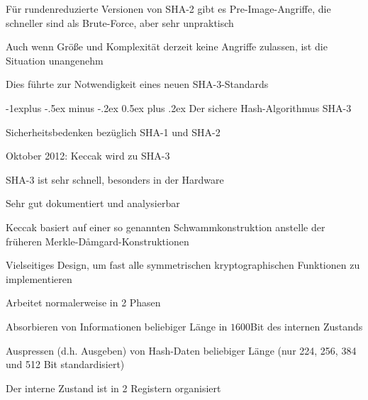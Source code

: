 \documentclass[a4paper]{article}
\makeatletter
\renewcommand{\subsection}{\@startsection{subsection}{2}{0mm}%
 {-1explus -.5ex minus -.2ex}%
 {0.5ex plus .2ex}%
 {\normalfont\normalsize\bfseries}}
\makeatother
\begin{document}
\begin{multicols}{3}
\begin{itemize*}
\begin{itemize*}
\begin{itemize*}
                        \item Für rundenreduzierte Versionen von SHA-2 gibt es Pre-Image-Angriffe, die schneller sind als Brute-Force, aber sehr unpraktisch
                        \item Auch wenn Größe und Komplexität derzeit keine Angriffe zulassen, ist die Situation unangenehm
                        \item Dies führte zur Notwendigkeit eines neuen SHA-3-Standards
                  \end{itemize*}
            \end{itemize*}
      \end{itemize*}

      \subsection{Der sichere Hash-Algorithmus SHA-3}
      \begin{itemize*}
            \item Sicherheitsbedenken bezüglich SHA-1 und SHA-2
            \begin{itemize*}
                  \item Oktober 2012: Keccak wird zu SHA-3
                  \item SHA-3 ist sehr schnell, besonders in der Hardware
                  \item Sehr gut dokumentiert und analysierbar
            \end{itemize*}
            \item Keccak basiert auf einer so genannten Schwammkonstruktion anstelle der früheren Merkle-Dåmgard-Konstruktionen
            \item Vielseitiges Design, um fast alle symmetrischen kryptographischen Funktionen zu implementieren
            \item Arbeitet normalerweise in 2 Phasen
            \begin{description*}
                  \item[Absorbieren] von Informationen beliebiger Länge in $1600$Bit des internen Zustands
                  \item[Auspressen] (d.h. Ausgeben) von Hash-Daten beliebiger Länge (nur 224, 256, 384 und 512 Bit standardisiert)
            \end{description*}
            \item Der interne Zustand ist in 2 Registern organisiert
            \begin{itemize*}

\end{itemize*}
\end{itemize*}
\end{multicols}
\end{document}
